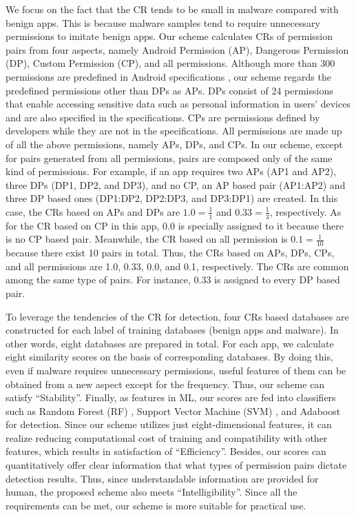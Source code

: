 \documentclass{ieeeaccess}
\begin{document}
We focus on the fact that the CR tends to be small in malware compared with benign apps.
This is because malware samples tend to require unnecessary permissions to imitate benign apps.
Our scheme calculates CRs of permission pairs from four aspects, namely Android Permission (AP), Dangerous Permission (DP), Custom Permission (CP), and all permissions.  
Although more than 300 permissions are predefined in Android specifications \cite{androidpermissionslist}, our scheme regards the predefined permissions other than DPs as APs.
DPs consist of 24 permissions that enable accessing sensitive data such as personal information in users' devices and are also specified in the specifications.
CPs are permissions defined by developers while they are not in the specifications.
All permissions are made up of all the above permissions, namely APs, DPs, and CPs.
In our scheme, except for pairs generated from all permissions, pairs are composed only of the same kind of permissions.
For example, if an app requires two APs (AP1 and AP2), three DPs (DP1, DP2, and DP3), and no CP, an AP based pair (AP1:AP2) and three DP based ones (DP1:DP2, DP2:DP3, and DP3:DP1) are created.
In this case, the CRs based on APs and DPs are $1.0 = \frac{1}{1}$ and $0.33 = \frac{1}{3}$, respectively.  
As for the CR based on CP in this app, 0.0 is specially assigned to it because there is no CP based pair.
Meanwhile, the CR based on all permission is $0.1 = \frac{1}{10}$ because there exist 10 pairs in total.
Thus, the CRs based on APs, DPs, CPs, and all permissions are 1.0, 0.33, 0.0, and 0.1, respectively.
The CRs are common among the same type of pairs.
For instance, 0.33 is assigned to every DP based pair.

To leverage the tendencies of the CR for detection, four CRs based databases are constructed for each label of training databases (benign apps and malware).
In other words, eight databases are prepared in total.
For each app, we calculate eight similarity scores on the basis of corresponding databases.
By doing this, even if malware requires unnecessary permissions, useful features of them can be obtained from a new aspect except for the frequency.
Thus, our scheme can satisfy ``Stability''.
Finally, as features in ML, our scores are fed into classifiers such as Random Forest (RF) \cite{breiman2001random}, Support Vector Machine (SVM) \cite{cortes1995support}, and Adaboost \cite{freund1997decision} for detection.
Since our scheme utilizes just eight-dimensional features, it can realize reducing computational cost of training and compatibility with other features, which results in satisfaction of ``Efficiency''.  
Besides, our scores can quantitatively offer clear information that what types of permission pairs dictate detection results.
Thus, since understandable information are provided for human, the proposed scheme also meets ``Intelligibility''.
Since all the requirements can be met, our scheme is more suitable for practical use.
\end{document}
